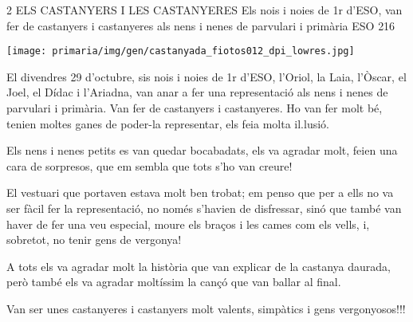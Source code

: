 %
%
\begin{news}
{2} %
{ELS CASTANYERS I LES CASTANYERES}
{Els nois i noies de 1r d’ESO,  van fer de castanyers i castanyeres als nens i nenes de parvulari i primària}
{ESO}
{216} %

\noindent\texttt{[image: primaria/img/gen/castanyada\_fiotos012\_dpi\_lowres.jpg]}

El divendres  29 d’octubre,  sis nois i noies de 1r d’ESO,  l’Oriol, la Laia, l’Òscar, el Joel, el Dídac i l’Ariadna,  van anar a fer una representació als nens i nenes de parvulari i primària. Van fer de castanyers i castanyeres. Ho van fer molt bé, tenien moltes ganes de poder-la representar, els feia molta il.lusió.

Els nens i nenes petits es van quedar bocabadats, els va agradar molt, feien una cara de sorpresos, que em sembla que tots s’ho van creure!

El vestuari que portaven estava molt ben trobat; em penso que per a ells no va ser fàcil fer la representació, no només s’havien de disfressar, sinó que també van haver de fer una veu especial, moure els braços i les cames com els vells, i, sobretot, no tenir gens de vergonya! 

A tots els va agradar molt la història que van explicar de la castanya daurada, però també els va agradar moltíssim la cançó que van ballar al final.

Van ser unes castanyeres i castanyers molt valents, simpàtics i gens vergonyosos!!!
						
\end{news}
